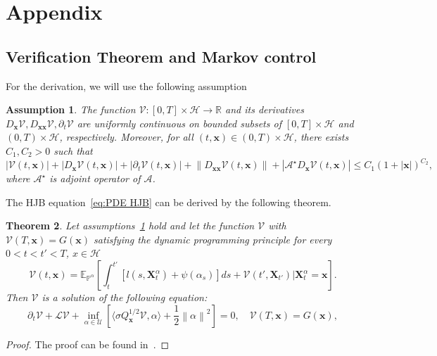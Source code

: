 \documentclass[nohyperref]{article}
\theoremstyle{plain}
\newtheorem{theorem}{Theorem}[section]
\newtheorem{assumption}[theorem]{Assumption}
\theoremstyle{remark}
\newcommand{\la}{\langle}
\newcommand{\ra}{\rangle}
\newcommand{\mc}{\mathcal}
\newcommand{\mb}{\mathbf}
\newcommand{\norm}[1]{\left\lVert#1\right\rVert}
\begin{document}

\section{Appendix}

\subsection{Verification Theorem and Markov control}
For the derivation, we will use the following assumption
\begin{assumption}\label{assumptions value function}
The function $\mc{V}: [0, T]\times \mc{H} \to \mathbb{R}$ and its derivatives $D_{\mb{x}} \mc{V}, D_{\mb{xx}} \mc{V}, \partial_t \mc{V}$ are uniformly continuous on bounded subsets of $[0, T] \times \mc{H}$ and $(0, T) \times \mc{H}$, respectively.
    Moreover, for all $(t, \mb{x}) \in (0, T) \times \mc{H}
    $, there exists $C_1, C_2 >0$ such that
    \begin{equation}
        |\mc{V}(t, \mb{x})| + |D_{\mb{x}}\mc{V}(t, \mb{x})| + |\partial_t \mc{V}(t, \mb{x})| + \norm{D_{\mb{xx}} \mc{V}(t, \mb{x})} + |\mc{A}^{\star} D_{\mb{x}} \mc{V}(t, \mb{x})| \leq C_1(1+ |\mb{x}|)^{C_2},
        \end{equation}
        where $\mc{A}^{\star}$ is adjoint operator of $\mc{A}$.
\end{assumption}
The HJB equation~\eqref{eq:PDE HJB} can be derived by the following theorem.
\begin{theorem}\label{DPP APPX} Let assumptions~\ref{assumptions value function} hold and let the function $\mc{V}$ with $\mc{V}(T, \mb{x}) = G(\mb{x})$ satisfying the dynamic programming principle for every $0 < t < t' < T$, $x \in \mc{H}$
\begin{equation}
    \mc{V}(t, \mb{x}) = \mathbb{E}_{\mathbb{P}^{\alpha}}\left[\int_t^{t'} \left[l(s, \mb{X}^{\alpha}_{t}) + \psi(\alpha_s)\right]ds + \mc{V}(t', \mb{X}_{t'})  | \mb{X}^{\alpha}_t = \mb{x}\right].
\end{equation}
Then $\mc{V}$ is a solution of the following equation:
\begin{equation}\label{eq:HJB APPX}
    \partial_t \mc{V} + \mc{L}\mc{V} + \inf_{\alpha \in \mc{U}} \left[ \la \sigma Q^{1/2} _{\mb{x}}\mc{V},  \alpha \ra + \frac{1}{2}\norm{\alpha}^2 \right] = 0, \quad \mc{V}(T, \mb{x}) = G(\mb{x}),
\end{equation}
\end{theorem}
\begin{proof}
The proof can be found in~\citep[Theorem~2.34]{fabbri2017stochastic}. 
\end{proof}
\end{document}
